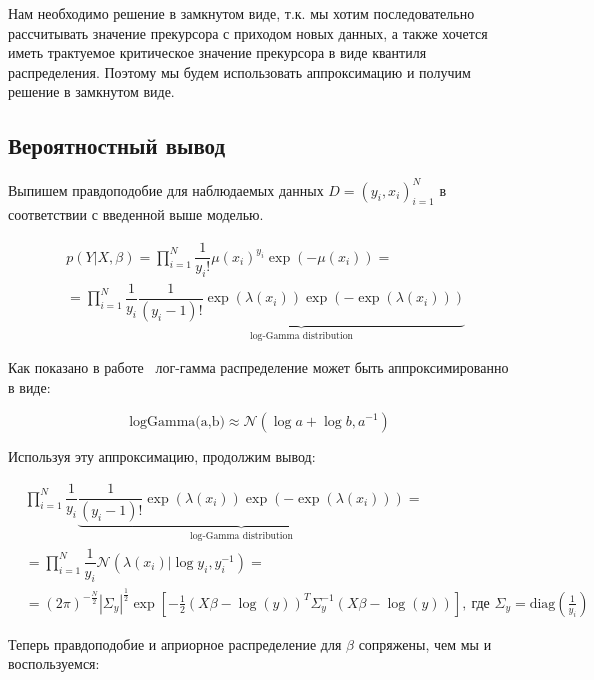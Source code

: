 Нам необходимо решение в замкнутом виде, т.к. мы хотим последовательно рассчитывать значение прекурсора с приходом новых данных, а также хочется иметь трактуемое критическое значение прекурсора в виде квантиля распределения. Поэтому мы будем использовать аппроксимацию и получим решение в замкнутом виде.

\subsection{Вероятностный вывод}
Выпишем правдоподобие для наблюдаемых данных $D=(y_i, x_i)_{i=1}^N$ в соответствии с введенной выше моделью.

\begin{equation*}
\begin{aligned}
& p(Y|X, \beta) = \prod\limits_{i=1}^{N}\dfrac{1}{y_i!}\mu(x_i)^{y_i}\exp(-\mu(x_i)) =  \\
& = \prod\limits_{i=1}^{N} \dfrac{1}{y_i}\underbrace{\dfrac{1}{(y_i - 1)!}\exp(\lambda(x_i))\exp(-\exp(\lambda(x_i)))}_{\text{log-Gamma distribution}}
\end{aligned}
\end{equation*} 

Как показано в работе~\cite{log_gamma_approx} лог-гамма распределение может быть аппроксимированно в виде:

$$
\text{logGamma(a,b)}\approx \mathcal{N}(\log a + \log b, a^{-1})
$$

Используя эту аппроксимацию, продолжим вывод:

\begin{equation*}
\begin{aligned}
& \prod\limits_{i=1}^{N} \dfrac{1}{y_i}\underbrace{\dfrac{1}{(y_i - 1)!}\exp(\lambda(x_i))\exp(-\exp(\lambda(x_i)))}_{\text{log-Gamma distribution}} = \\
& = \prod\limits_{i=1}^{N} \dfrac{1}{y_i}\mathcal{N}(\lambda(x_i)|\log y_i, y_i^{-1}) = \\
& = (2\pi)^{-\frac{N}{2}}|\Sigma_y|^{\frac{1}{2}}\exp\left[-\frac{1}{2}(X\beta - \log(y))^T \Sigma^{-1}_y (X\beta - \log(y))  \right],~\text{где } \Sigma_y = \text{diag}\left(\frac{1}{y_i}\right)
\end{aligned}
\end{equation*} 

Теперь правдоподобие и априорное распределение для $\beta$ сопряжены, чем мы и воспользуемся:

